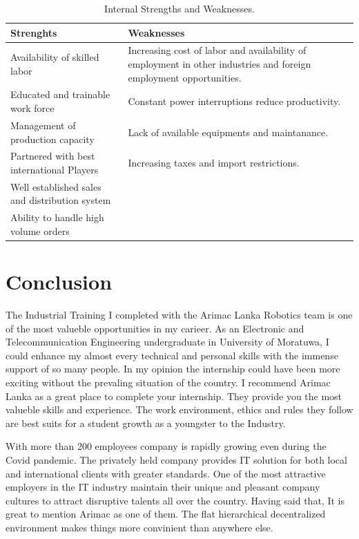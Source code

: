 \documentclass[twoside,12pt,times,onecolumn,a4paper]{report}
\begin{document}
\begin{table}[!h]
\centering
 \begin{tabular}{||p{}|p{}||}
 \hline
 Strenghts &  Weaknesses \\ [0.5ex] 
 \hline\hline
 Availability of skilled labor & Increasing cost of labor and availability of employment in other industries and foreign employment opportunities. \\ 
 \hline
 Educated and trainable work force & Constant power interruptions reduce productivity.  \\
 \hline
Management of production capacity  & Lack of available equipments and maintanance.  \\  
 \hline
Partnered with best international Players & Increasing taxes and import restrictions.\\
 \hline
Well established sales and distribution system &   \\
 \hline
Ability to handle high volume orders &   \\ [1ex]
\hline
 \end{tabular}
\caption{Internal Strengths and Weaknesses.}
\label{tab:table1}
\end{table}


\chapter{Conclusion}
\hspace{3em} The Industrial Training I completed with the Arimac Lanka Robotics team is one of the most valueble opportunities in my carieer. As an Electronic and Telecommunication Engineering undergraduate in University of Moratuwa, I could enhance my almost every technical and personal skills with the immense support of so many people. In my opinion the internship could have been more exciting without the prevaling situation of the country. I recommend Arimac Lanka as a great place to complete your internship. They provide you the most valueble skills and experience. The work environment, ethics and rules they follow are best suits for a student growth as a youngster to the Industry. 

With more than 200 employees company is rapidly growing even during the Covid pandemic. The privately held company provides IT solution for both local and international clients with greater standards. One of the most attractive employers in the IT industry maintain their unique and pleasant company cultures to attract disruptive talents all over the country. Having said that, It is great to mention Arimac as one of them. The flat hierarchical decentralized environment makes things more convinient than anywhere else. 
\end{document}

